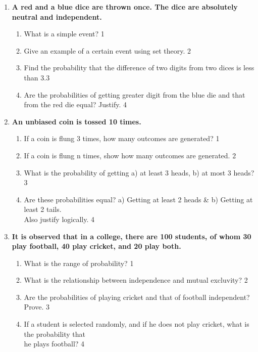 \documentclass[a4paper,oneside, margin=1.4in]{book}
\begin{document}
\begin{enumerate}
 \item
	  \textbf{A red and a blue dice are thrown once. The dice are absolutely neutral and independent.} 
  
  \begin{enumerate}
    \item
	What is a simple event? \hfill 1
    \item
	Give an example of a certain event using set theory. \hfill 2
    \item  
	Find the probability that the difference of two digits from two dices is less than 3.\hfill 3
    \item
	Are the probabilities of getting greater digit from the blue die and that from the red die equal? Justify. \hfill 4
  \end{enumerate}
  
  \item
	  \textbf{An unbiased coin is tossed 10 times.} 
  
  \begin{enumerate}
    \item
	If a coin is flung 3 times, how many outcomes are generated? \hfill 1
    \item
	If a coin is flung n times, show how many outcomes are generated. \hfill 2
    \item  
	What is the probability of getting a) at least 3 heads, b) at most 3 heads? \hfill 3
    \item
	Are these probabilities equal? a) Getting at least 2 heads \& b) Getting at least 2 tails. \\ Also justify logically. \hfill 4
  \end{enumerate}
  
  \item
  \textbf{It is observed that in a college, there are 100 students, of whom 30 play football, 40 play cricket, and 20 play both.}
 
  \begin{enumerate}
    \item
	What is the range of probability? \hfill 1
    \item
    	What is the relationship between independence and mutual excluvity?  \hfill 2
    \item
    	Are the probabilities of playing cricket and that of football independent? Prove. \hfill 3
     \item
     	If a student is selected randomly, and if he does not play cricket, what is the probability that \\ he plays football? \hfill 4
  \end{enumerate}


\end{enumerate}
\end{document}
